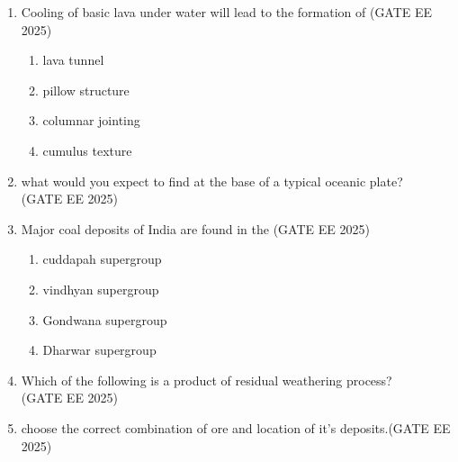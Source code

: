 \documentclass[journal]{IEEEtran}
\begin{document}
\begin{enumerate}[start=1]
\item Cooling of basic lava under water will lead to the formation of 
\hfill{(GATE EE 2025)}
\begin{enumerate}
    \item lava tunnel
    \item pillow structure
    \item columnar jointing
    \item cumulus texture
\end{enumerate}

\item what would you expect to find at the base of a typical oceanic plate?\\
\hfill{(GATE EE 2025)}
\begin{enumerate}
\end{enumerate}

\item Major coal deposits of India are found in the
\hfill{(GATE EE 2025)}
\begin{enumerate}
    \item cuddapah supergroup
    \item vindhyan supergroup
    \item Gondwana supergroup
    \item Dharwar supergroup
\end{enumerate}

\item Which of the following is a product of residual weathering process?\\
\hfill{(GATE EE 2025)}
\begin{enumerate}
\end{enumerate}

\item choose the correct combination of ore and location of it's deposits.\hfill{(GATE EE 2025)}


\end{enumerate}
\end{document}

